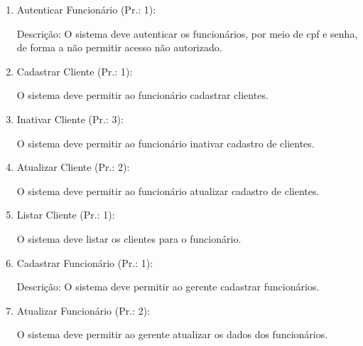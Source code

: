 \begin{enumerate}[
	label=RF\arabic{*}, 
	ref=(RF\arabic{*}),
	leftmargin=1.5em,
	itemindent=4.5em]
	

\item Autenticar Funcionário (Pr.: 1):\par
Descrição: O sistema deve autenticar os funcionários, por meio de cpf e senha, de forma a não permitir acesso não autorizado.\par

\item Cadastrar Cliente (Pr.: 1):\par
O sistema deve permitir ao funcionário cadastrar clientes.\par

\item Inativar Cliente (Pr.: 3):\par
O sistema deve permitir ao funcionário inativar cadastro de clientes.\par

\item Atualizar Cliente (Pr.: 2):\par
O sistema deve permitir ao funcionário atualizar cadastro de clientes.\par

\item Listar Cliente (Pr.: 1):\par
O sistema deve listar os clientes para o funcionário.\par

\item Cadastrar Funcionário (Pr.: 1):\par
Descrição: O sistema deve permitir ao gerente cadastrar funcionários.\par

\item  Atualizar Funcionário (Pr.: 2):\par
O sistema deve permitir ao gerente atualizar os dados dos funcionários.\par


\end{enumerate}
